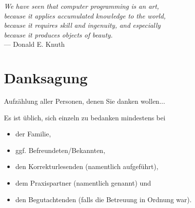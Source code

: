 \cleardoublepage
{}
\begin{flushright}{\slshape
    We have seen that computer programming is an art, \\
    because it applies accumulated knowledge to the world, \\
    because it requires skill and ingenuity, and especially \\
    because it produces objects of beauty.} \\ \medskip
    --- {Donald E. Knuth}\cite{knuth1974}
\end{flushright}

\bigskip

\begingroup
\let\clearpage\relax
\let\cleardoublepage\relax
\let\cleardoublepage\relax
\chapter*{Danksagung}
Aufzählung aller Personen, denen Sie danken wollen...


\noindent Es ist üblich, sich einzeln zu bedanken mindestens bei
\begin{itemize}
    \item der Familie,
    \item ggf. Befreundeten/Bekannten,
    \item den Korrekturlesenden (namentlich aufgeführt),
    \item dem Praxispartner (namentlich genannt) und
    \item den Begutachtenden (falls die Betreuung in Ordnung war).
\end{itemize}
\endgroup